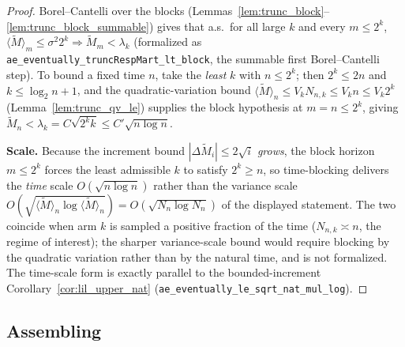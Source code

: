 \begin{proof}\leanok
{}
Borel--Cantelli over the blocks (Lemmas~\ref{lem:trunc_block}--\ref{lem:trunc_block_summable})
gives that a.s.\ for all large $k$ and every $m\le 2^k$, $\langle\tilde M\rangle_m\le\sigma^2 2^k
\Rightarrow \tilde M_m<\lambda_k$ (formalized as
\texttt{ae\_eventually\_truncRespMart\_lt\_block}, the summable first Borel--Cantelli step). To
bound a fixed time $n$, take the \emph{least} $k$ with $n\le 2^k$; then $2^k\le 2n$ and
$k\le\log_2 n+1$, and the quadratic-variation bound $\langle\tilde M\rangle_n\le V_k N_{n,k}\le V_k
n\le V_k 2^k$ (Lemma~\ref{lem:trunc_qv_le}) supplies the block hypothesis at $m=n\le 2^k$, giving
$\tilde M_n<\lambda_k=C\sqrt{2^k k}\le C'\sqrt{n\log n}$.

\textbf{Scale.} Because the increment bound $|\Delta\tilde M_i|\le2\sqrt i$ \emph{grows}, the block
horizon $m\le 2^k$ forces the least admissible $k$ to satisfy $2^k\ge n$, so time-blocking delivers
the \emph{time} scale $O(\sqrt{n\log n})$ rather than the variance scale
$O(\sqrt{\langle\tilde M\rangle_n\log\langle\tilde M\rangle_n})=O(\sqrt{N_n\log N_n})$ of the
displayed statement. The two coincide when arm $k$ is sampled a positive fraction of the time
($N_{n,k}\asymp n$, the regime of interest); the sharper variance-scale bound would require blocking
by the quadratic variation rather than by the natural time, and is not formalized. The time-scale
form is exactly parallel to the bounded-increment Corollary~\ref{cor:lil_upper_nat}
(\texttt{ae\_eventually\_le\_sqrt\_nat\_mul\_log}).
\end{proof}

\subsection{Assembling}

